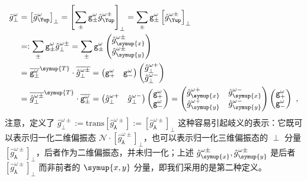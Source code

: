 \begin{subequations} \label{eq:2-151}
	\abovedisplayskip=10pt
	\belowdisplayskip=10pt
	\begin{align}
		\bar{g}^{\omega}_{\perp} &= \left[ \bar{g}^{\omega}_{\Yup} \right]_{\perp} = \left[ \sum_{\pm} {\mathtt{g}}^{\omega}_{\pm} \hat{g}^{\omega\pm}_{\Yup} \right]_{\perp} = \sum_{\pm} {\mathtt{g}}^{\omega}_{\pm} \left[ \hat{g}^{\omega\pm}_{\Yup} \right]_{\perp} \label{eq:2-151a}\\ &=: \sum_{\pm} {\mathtt{g}}^{\omega}_{\pm} \hat{g}^{\omega\pm}_{\perp} = \sum_{\pm} {\mathtt{g}}^{\omega}_{\pm} \begin{pmatrix} \hat{g}^{\omega\pm}_{\symup{x}} \\ \hat{g}^{\omega\pm}_{\symup{y}} \end{pmatrix} \label{eq:2-151b}\\ &= \overline{{\mathtt{g}}^{\omega}_{\pm}}^{\symup{T}} \cdot \overline{\hat{g}^{\omega\pm}_{\perp}} = \begin{pmatrix} {\mathtt{g}}^{\omega}_{+} & {\mathtt{g}}^{\omega}_{-} \end{pmatrix} \begin{pmatrix} \hat{g}^{\omega+}_{\perp} \\ \hat{g}^{\omega-}_{\perp} \end{pmatrix} \label{eq:2-151c}\\ &= \overline{\hat{g}^{\omega\pm}_{\perp}}^{\symup{T}} \cdot \overline{{\mathtt{g}}^{\omega}_{\pm}} = \begin{pmatrix} \hat{g}^{\omega+}_{\perp} & \hat{g}^{\omega-}_{\perp} \end{pmatrix} \begin{pmatrix} {\mathtt{g}}^{\omega}_{+} \\ {\mathtt{g}}^{\omega}_{-} \end{pmatrix} = \begin{pmatrix} \hat{g}^{\omega+}_{\symup{x}} & \hat{g}^{\omega-}_{\symup{x}} \\ \hat{g}^{\omega+}_{\symup{y}} & \hat{g}^{\omega-}_{\symup{y}} \end{pmatrix} \begin{pmatrix} {\mathtt{g}}^{\omega}_{+} \\ {\mathtt{g}}^{\omega}_{-} \end{pmatrix} \label{eq:2-151d}~,
	\end{align}
\end{subequations}
注意，定义了 $\hat{g}^{\omega\pm}_{\perp} := \text{trans} \left[ \hat{g}^{\omega\pm}_{\Yup} \right] := \left[ \hat{g}^{\omega\pm}_{\Yup} \right]_{\perp}$ 这种容易引起岐义的表示：它既可以表示归一化二维偏振态 $\mathcal{N} \cdot \left[ \hat{g}^{\omega\pm}_{\Yup} \right]_{\perp}$，也可以表示归一化三维偏振态的 $\perp$ 分量 $\left[ \hat{g}^{\omega\pm}_{\Yup} \right]_{\perp}$，后者作为二维偏振态，并未归一化；上述 $\hat{g}^{\omega\pm}_{\symup{x}},\hat{g}^{\omega\pm}_{\symup{y}}$ 是后者 $\left[ \hat{g}^{\omega\pm}_{\Yup} \right]_{\perp}$ 而非前者的 $\symup{x,y}$ 分量，即我们采用的是第二种定义。

